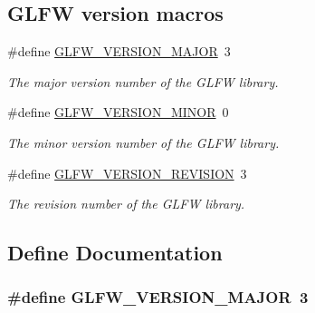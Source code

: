 \subsection*{\-G\-L\-F\-W version macros}
\begin{DoxyCompactItemize}
\item 
\#define \hyperlink{group__init_ga6337d9ea43b22fc529b2bba066b4a576}{\-G\-L\-F\-W\-\_\-\-V\-E\-R\-S\-I\-O\-N\-\_\-\-M\-A\-J\-O\-R}~3
\begin{DoxyCompactList}\small\item\em \-The major version number of the \-G\-L\-F\-W library. \end{DoxyCompactList}\item 
\#define \hyperlink{group__init_gaf80d40f0aea7088ff337606e9c48f7a3}{\-G\-L\-F\-W\-\_\-\-V\-E\-R\-S\-I\-O\-N\-\_\-\-M\-I\-N\-O\-R}~0
\begin{DoxyCompactList}\small\item\em \-The minor version number of the \-G\-L\-F\-W library. \end{DoxyCompactList}\item 
\#define \hyperlink{group__init_gab72ae2e2035d9ea461abc3495eac0502}{\-G\-L\-F\-W\-\_\-\-V\-E\-R\-S\-I\-O\-N\-\_\-\-R\-E\-V\-I\-S\-I\-O\-N}~3
\begin{DoxyCompactList}\small\item\em \-The revision number of the \-G\-L\-F\-W library. \end{DoxyCompactList}\end{DoxyCompactItemize}


\subsection{\-Define \-Documentation}
\hypertarget{group__init_ga6337d9ea43b22fc529b2bba066b4a576}{
\subsubsection[{\-G\-L\-F\-W\-\_\-\-V\-E\-R\-S\-I\-O\-N\-\_\-\-M\-A\-J\-O\-R}]{\setlength{\rightskip}{0pt plus 5cm}\#define {\bf \-G\-L\-F\-W\-\_\-\-V\-E\-R\-S\-I\-O\-N\-\_\-\-M\-A\-J\-O\-R}~3}}\label{group__init_ga6337d9ea43b22fc529b2bba066b4a576}


